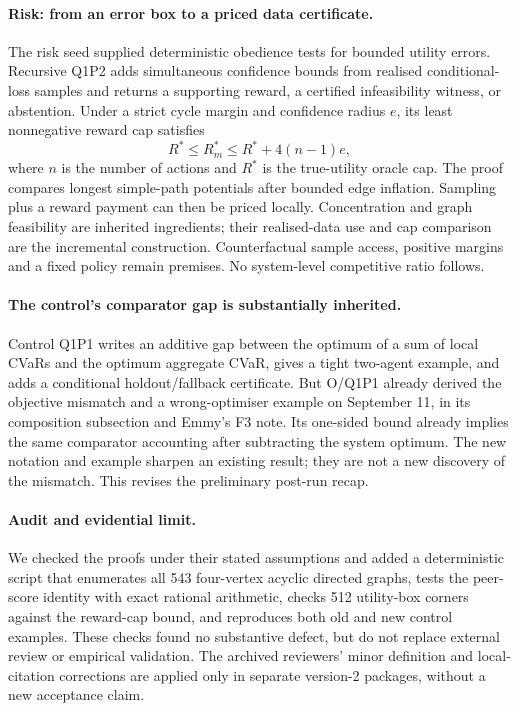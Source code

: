 \documentclass[11pt,a4paper]{article}
\begin{document}
\paragraph{Risk: from an error box to a priced data certificate.}
The risk seed supplied deterministic obedience tests for bounded utility
errors. Recursive Q1P2 adds simultaneous confidence bounds from realised
conditional-loss samples and returns a supporting reward, a certified
infeasibility witness, or abstention. Under a strict cycle margin and
confidence radius $e$, its least nonnegative reward cap satisfies
\[
R^*\leq R_m^*\leq R^*+4(n-1)e,
\]
where $n$ is the number of actions and $R^*$ is the true-utility oracle cap.
The proof compares longest simple-path potentials after bounded edge
inflation. Sampling plus a reward payment can then be priced locally.
Concentration and graph feasibility are inherited ingredients; their
realised-data use and cap comparison are the incremental construction.
Counterfactual sample access, positive margins and a fixed policy remain
premises. No system-level competitive ratio follows.

\paragraph{The control's comparator gap is substantially inherited.}
Control Q1P1 writes an additive gap between the optimum of a sum of local
CVaRs and the optimum aggregate CVaR, gives a tight two-agent example, and
adds a conditional holdout/fallback certificate. But O/Q1P1 already derived
the objective mismatch and a wrong-optimiser example on September 11, in
its composition subsection and Emmy's F3 note. Its one-sided bound already
implies the same comparator accounting after subtracting the system optimum.
The new notation and example sharpen an existing result; they are not a
new discovery of the mismatch. This revises the preliminary post-run recap.

\paragraph{Audit and evidential limit.}
We checked the proofs under their stated assumptions and added a deterministic
script that enumerates all 543 four-vertex acyclic directed graphs, tests
the peer-score identity with exact rational arithmetic, checks 512 utility-box
corners against the reward-cap bound, and reproduces both old and new control
examples. These checks found no substantive defect, but do not replace
external review or empirical validation. The archived reviewers' minor
definition and local-citation corrections are applied only in separate
version-2 packages, without a new acceptance claim.
\end{document}
